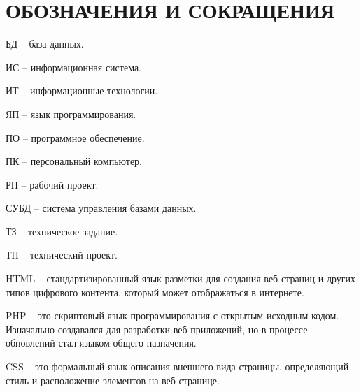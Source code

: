 \section*{ОБОЗНАЧЕНИЯ И СОКРАЩЕНИЯ}

БД -- база данных.

ИС -- информационная система.

ИТ -- информационные технологии. 

ЯП -- язык программирования.

ПО -- программное обеспечение.

ПК -- персональный компьютер.

РП -- рабочий проект.

СУБД -- система управления базами данных.

ТЗ -- техническое задание.

ТП -- технический проект.

HTML -- стандартизированный язык разметки для создания веб-страниц и других типов цифрового контента, который может отображаться в интернете.

PHP --  это скриптовый язык программирования с открытым исходным кодом. Изначально создавался для разработки веб-приложений, но в процессе обновлений стал языком общего назначения.

CSS -- это формальный язык описания внешнего вида страницы, определяющий стиль и расположение элементов на веб-странице.
